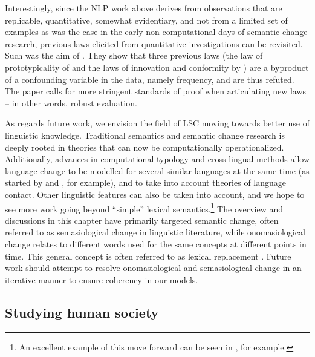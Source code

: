 \documentclass[output=paper]{langscibook}
\begin{document}
Interestingly, since the NLP work above derives from observations that are replicable, quantitative, somewhat evidentiary, and not from a limited set of examples as was the case in the early non-computational days of semantic change research, previous laws elicited from quantitative investigations can be revisited. 
Such was the aim of \citet{dubossarsky-etal-2017-outta}. They show that three previous laws (the law of prototypicality of \citealt{dubossarsky2015bottom}  and the laws of innovation and conformity by \citealt{hamilton-etal-2016-diachronic}) are a byproduct of a confounding variable in the data, namely frequency, and are thus refuted. The paper calls for more stringent standards of proof when articulating new laws -- in other words, robust evaluation.

As regards future work, we envision the field of LSC moving towards better use of linguistic knowledge.
Traditional semantics and semantic change research is deeply rooted in theories that can now be computationally operationalized. 
Additionally, advances in computational typology and cross-lingual methods allow  language change to be modelled for several similar languages at the same time (as started by \citealt{uban-etal-2019-studying} and \citealt{frossard-etal-2020-dataset}, for example), and to take into account theories of language contact.
Other linguistic features can also be taken into account, and we hope to see more work going beyond ``simple'' lexical semantics.\footnote{An excellent example of this move forward can be seen in \citet{fonteyn2020grammar}, for example.}
The overview and discussions in this chapter have primarily targeted semantic change, often referred to as semasiological change in linguistic literature, while onomasiological change relates to different words used for the same concepts at different points in time. This general concept is often referred to as lexical replacement \citep{tahmasebi2018survey}. Future work should attempt to resolve onomasiological and semasiological change in an iterative manner to ensure coherency in our models. 

\subsection{Studying human society}
\end{document}
